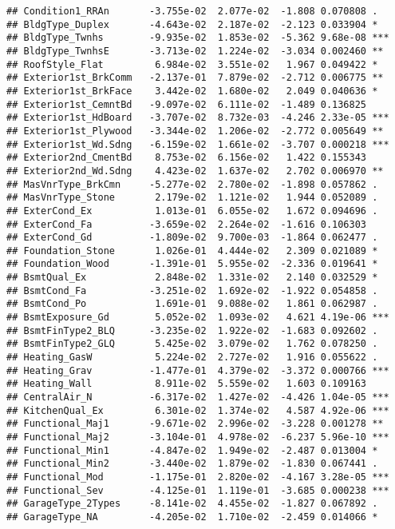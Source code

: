 \documentclass[
]{article}
\begin{document}
\begin{verbatim}
## Condition1_RRAn       -3.755e-02  2.077e-02  -1.808 0.070808 .  
## BldgType_Duplex       -4.643e-02  2.187e-02  -2.123 0.033904 *  
## BldgType_Twnhs        -9.935e-02  1.853e-02  -5.362 9.68e-08 ***
## BldgType_TwnhsE       -3.713e-02  1.224e-02  -3.034 0.002460 ** 
## RoofStyle_Flat         6.984e-02  3.551e-02   1.967 0.049422 *  
## Exterior1st_BrkComm   -2.137e-01  7.879e-02  -2.712 0.006775 ** 
## Exterior1st_BrkFace    3.442e-02  1.680e-02   2.049 0.040636 *  
## Exterior1st_CemntBd   -9.097e-02  6.111e-02  -1.489 0.136825    
## Exterior1st_HdBoard   -3.707e-02  8.732e-03  -4.246 2.33e-05 ***
## Exterior1st_Plywood   -3.344e-02  1.206e-02  -2.772 0.005649 ** 
## Exterior1st_Wd.Sdng   -6.159e-02  1.661e-02  -3.707 0.000218 ***
## Exterior2nd_CmentBd    8.753e-02  6.156e-02   1.422 0.155343    
## Exterior2nd_Wd.Sdng    4.423e-02  1.637e-02   2.702 0.006970 ** 
## MasVnrType_BrkCmn     -5.277e-02  2.780e-02  -1.898 0.057862 .  
## MasVnrType_Stone       2.179e-02  1.121e-02   1.944 0.052089 .  
## ExterCond_Ex           1.013e-01  6.055e-02   1.672 0.094696 .  
## ExterCond_Fa          -3.659e-02  2.264e-02  -1.616 0.106303    
## ExterCond_Gd          -1.809e-02  9.700e-03  -1.864 0.062477 .  
## Foundation_Stone       1.026e-01  4.444e-02   2.309 0.021089 *  
## Foundation_Wood       -1.391e-01  5.955e-02  -2.336 0.019641 *  
## BsmtQual_Ex            2.848e-02  1.331e-02   2.140 0.032529 *  
## BsmtCond_Fa           -3.251e-02  1.692e-02  -1.922 0.054858 .  
## BsmtCond_Po            1.691e-01  9.088e-02   1.861 0.062987 .  
## BsmtExposure_Gd        5.052e-02  1.093e-02   4.621 4.19e-06 ***
## BsmtFinType2_BLQ      -3.235e-02  1.922e-02  -1.683 0.092602 .  
## BsmtFinType2_GLQ       5.425e-02  3.079e-02   1.762 0.078250 .  
## Heating_GasW           5.224e-02  2.727e-02   1.916 0.055622 .  
## Heating_Grav          -1.477e-01  4.379e-02  -3.372 0.000766 ***
## Heating_Wall           8.911e-02  5.559e-02   1.603 0.109163    
## CentralAir_N          -6.317e-02  1.427e-02  -4.426 1.04e-05 ***
## KitchenQual_Ex         6.301e-02  1.374e-02   4.587 4.92e-06 ***
## Functional_Maj1       -9.671e-02  2.996e-02  -3.228 0.001278 ** 
## Functional_Maj2       -3.104e-01  4.978e-02  -6.237 5.96e-10 ***
## Functional_Min1       -4.847e-02  1.949e-02  -2.487 0.013004 *  
## Functional_Min2       -3.440e-02  1.879e-02  -1.830 0.067441 .  
## Functional_Mod        -1.175e-01  2.820e-02  -4.167 3.28e-05 ***
## Functional_Sev        -4.125e-01  1.119e-01  -3.685 0.000238 ***
## GarageType_2Types     -8.141e-02  4.455e-02  -1.827 0.067892 .  
## GarageType_NA         -4.205e-02  1.710e-02  -2.459 0.014066 *  

\end{verbatim}
\end{document}
